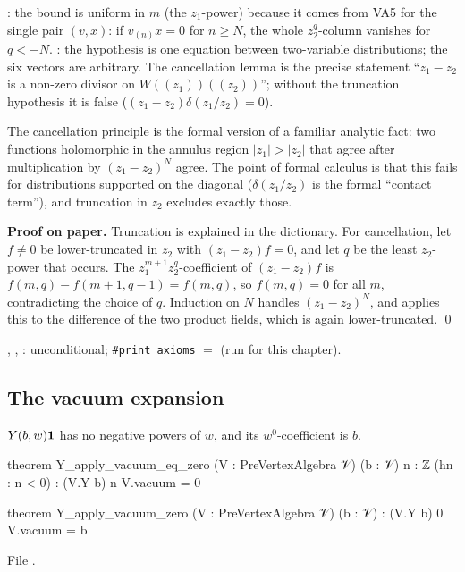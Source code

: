 \begin{dictionary}
: the bound is uniform in $m$ (the $z_1$-power) because it comes from VA5 for
the single pair $(v,x)$: if $v_{(n)}x = 0$ for $n\ge N$, the whole $z_2^q$-column vanishes for
$q<-N$. : the hypothesis is one equation between two-variable distributions; the
six vectors are arbitrary. The cancellation lemma is the precise statement ``$z_1-z_2$ is a non-zero
divisor on $W((z_1))((z_2))$''; without the truncation hypothesis it is false
($(z_1-z_2)\delta(z_1/z_2) = 0$).
\end{dictionary}

\begin{physics}
The cancellation principle is the formal version of a familiar analytic fact: two functions
holomorphic in the annulus region $|z_1|>|z_2|$ that agree after multiplication by $(z_1-z_2)^N$
agree. The point of formal calculus is that this fails for distributions supported on the diagonal
($\delta(z_1/z_2)$ is the formal ``contact term''), and truncation in $z_2$ excludes exactly those.
\end{physics}

\textbf{Proof on paper.} Truncation is explained in the dictionary. For cancellation, let
$f\ne0$ be lower-truncated in $z_2$ with $(z_1-z_2)f = 0$, and let $q$ be the least $z_2$-power that
occurs. The $z_1^{m+1}z_2^q$-coefficient of $(z_1-z_2)f$ is $f(m,q) - f(m+1,q-1) = f(m,q)$, so
$f(m,q) = 0$ for all $m$, contradicting the choice of $q$. Induction on $N$ handles $(z_1-z_2)^N$, and
 applies this to the difference of the two product fields, which is again
lower-truncated. \qed

\begin{status}
, , : unconditional;
\texttt{\#print axioms}  $=$
 (run for this chapter).
\end{status}

\subsection{The vacuum expansion}

\begin{lemma}\label{l03:lem:vacexp}
$Y(b,w)\mathbf{1}$ has no negative powers of $w$, and its $w^0$-coefficient is $b$.
\end{lemma}
\begin{leancode}
theorem Y_apply_vacuum_eq_zero (V : PreVertexAlgebra 𝒱) (b : 𝒱) {n : ℤ} (hn : n < 0) :
    (V.Y b) n V.vacuum = 0

theorem Y_apply_vacuum_zero (V : PreVertexAlgebra 𝒱) (b : 𝒱) : (V.Y b) 0 V.vacuum = b
\end{leancode}
File .

